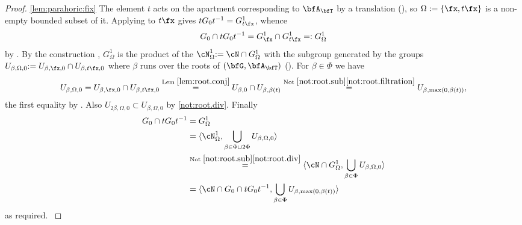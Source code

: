 \documentclass[12pt,a4paper]{amsart}%
\newcommand{\claude}[1]{{{#1}}}
\newcommand{\RamiF}[1]{{{#1}}}
\begin{document}
\begin{proof}
\claude{\eqref{lem:parahoric:fix} The element $t$ acts on the apartment corresponding to $\bfA_\bfT$ by a translation (\cite[Axiom~4.1.4(A\,1)]{KP}), so $\Omega:=\{\fx,t\fx\}$ is a non-empty bounded subset of it. Applying \cite[Lemma 4.3.3]{KP} to $t\fx$ gives $tG_0t^{-1}=\RamiF{G}^1_{t\fx}$, whence
$$
G_0\cap tG_0t^{-1}=\RamiF{G}^1_\fx\cap \RamiF{G}^1_{t\fx}=:\RamiF{G}^1_\Omega
$$
by \cite[Lemma 7.7.4]{KP}. By the construction \cite[(7.7.1)]{KP}, $\RamiF{G}^1_\Omega$ is the product of the %
$\RamiF{\cN}^1_\Omega\RamiF{:=\cN\cap \RamiF{G}^1_\Omega}$
with the subgroup generated by the groups $U_{\beta,\Omega,0}\RamiF{:=U_{\beta,\fx,0}\cap U_{\beta,t\fx,0}}$ \RamiF{where} $\beta$ \RamiF{runs} over the roots of $(\bfG,\bfA_\bfT)$ (\cite[Definition~7.4.1(2)]{KP}). For $\beta\in\Phi$ we have
$$
U_{\beta,\Omega,0}=U_{\beta,\fx,0}\cap U_{\beta,t\fx,0}
\overset{\text{Lem }\ref{lem:root.conj}}{=}U_{\beta,0}\cap U_{\beta,\beta(t)}
\overset{\text{Not }\ref{not:root.sub}\eqref{not:root.filtration}}{=}U_{\beta,\max(0,\beta(t))},
$$
the first equality by \cite[Definition~7.4.1(1)]{KP}.
\RamiF{Also} $U_{2\beta,\Omega,0}\subset U_{\beta,\Omega,0}$ by \Cref{not:root.sub}\eqref{not:root.div}. Finally
\RamiF{
\begin{align*}
G_0\cap tG_0t^{-1}&={G}^1_\Omega\\
&=\langle 
\cN^1_\Omega,\bigcup_{\beta\in \Phi \cup 2\Phi} U_{\beta,\Omega,0}\rangle\\
&\overset{\claude{\text{Not }\ref{not:root.sub}\eqref{not:root.div}}}{=}
\langle 
\cN \cap  {G}^1_\Omega,\bigcup_{\beta\in \Phi} U_{\beta,\Omega,0}\rangle\\
&=
\langle 
\cN \cap G_0\cap tG_0t^{-1} ,\bigcup_{\beta\in \Phi} U_{\beta,\max(0,\beta(t))}\rangle
\end{align*}
as required.
}
}
\end{proof}
\end{document}
